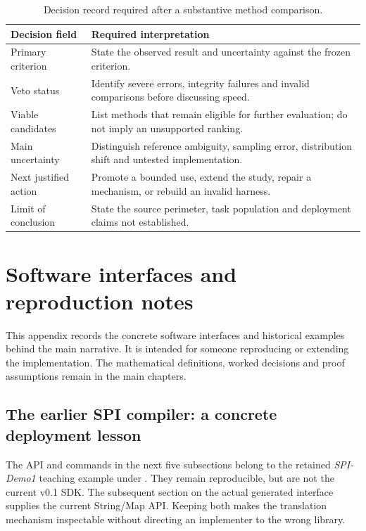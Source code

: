 \documentclass[12pt,a4paper,oneside,openany]{book}
\begin{document}
\begin{table}[htbp]
\centering\small
\caption{Decision record required after a substantive method comparison.}
\begin{tabularx}{\textwidth}{P{39mm}Y}
\toprule
Decision field & Required interpretation\\\midrule
Primary criterion & State the observed result and uncertainty against the frozen criterion.\\
Veto status & Identify severe errors, integrity failures and invalid comparisons before discussing speed.\\
Viable candidates & List methods that remain eligible for further evaluation; do not imply an unsupported ranking.\\
Main uncertainty & Distinguish reference ambiguity, sampling error, distribution shift and untested implementation.\\
Next justified action & Promote a bounded use, extend the study, repair a mechanism, or rebuild an invalid harness.\\
Limit of conclusion & State the source perimeter, task population and deployment claims not established.\\
\bottomrule
\end{tabularx}
\end{table}

\chapter{Software interfaces and reproduction notes}
\label{app:technical-reference}

This appendix records the concrete software interfaces and historical examples
behind the main narrative. It is intended for someone reproducing or extending
the implementation. The mathematical definitions, worked decisions and proof
assumptions remain in the main chapters.

\section{The earlier SPI compiler: a concrete deployment lesson}

The API and commands in the next five subsections belong to the retained
\emph{SPI-Demo1} teaching example under . They remain
reproducible, but are not the current v0.1 SDK. The subsequent section on the actual
generated interface supplies the current String/Map API. Keeping both makes the
translation mechanism inspectable without directing an implementer to the wrong
library.
\end{document}
